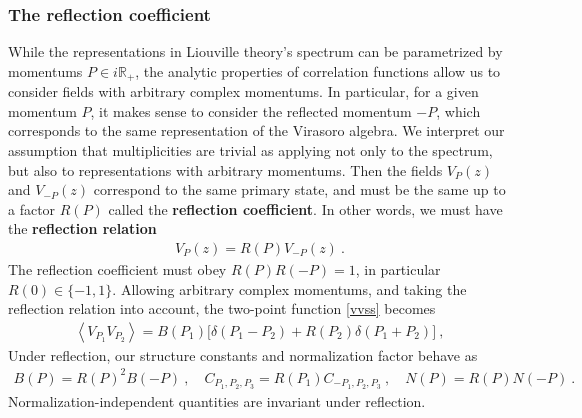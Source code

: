 \documentclass[12pt, a4paper, notitlepage, twoside]{report}
\numberwithin{equation}{section}
\theoremstyle{break}
\begin{document}
\subsubsection{The reflection coefficient}

While the representations in Liouville theory's spectrum can be parametrized by momentums $P\in i\mathbb{R}_+$, the analytic properties of correlation functions allow us to consider fields with arbitrary complex momentums. 
In particular, for a given momentum $P$, it makes sense to consider the reflected momentum $-P$, which corresponds to the same representation of the Virasoro algebra. 
We interpret our assumption that multiplicities are trivial as applying not only to the spectrum, but also to representations with arbitrary momentums. Then the fields $V_P(z)$ and $V_{-P}(z)$ correspond to the same primary state, and must be the same up to a factor $R(P)$ called the \textbf{\boldmath reflection coefficient}. In other words, we must have the \textbf{\boldmath reflection relation}
\begin{align}
V_P(z)= R(P) V_{-P}(z)\ .
\label{vrv}
\end{align}
The reflection coefficient must obey $R(P)R(-P)=1$, in particular $R(0)\in \{-1,1\}$. Allowing arbitrary complex momentums, and taking the reflection relation into account, the two-point function \eqref{vvss} becomes 
\begin{align}
 \left<V_{P_1}V_{P_2}\right> = B(P_1)\Big[ \delta(P_1-P_2) + R(P_2)\delta(P_1+P_2) \Big]\ ,
\end{align}
Under reflection, our structure constants and normalization factor behave as 
\begin{align}
 B(P)=R(P)^2B(-P) \ , \quad C_{P_1,P_2,P_3} = R(P_1) C_{-P_1,P_2,P_3} \ , \quad N(P)=R(P)N(-P)\ .
\end{align}
Normalization-independent quantities are invariant under reflection.
\end{document}
